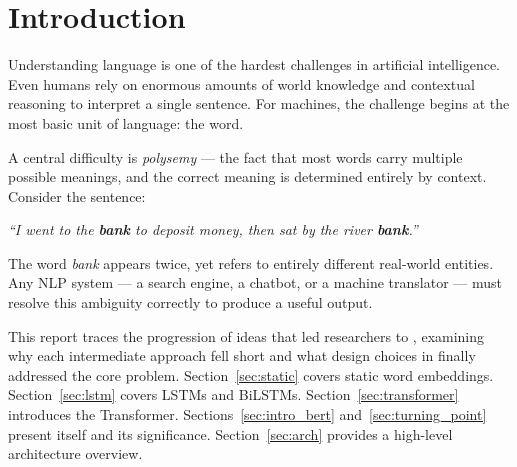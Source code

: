 \section{Introduction}
\label{sec:introduction}

Understanding language is one of the hardest challenges in artificial
intelligence. Even humans rely on enormous amounts of world knowledge and
contextual reasoning to interpret a single sentence. For machines, the
challenge begins at the most basic unit of language: the word.

A central difficulty is \emph{polysemy} --- the fact that most words carry
multiple possible meanings, and the correct meaning is determined entirely by
context. Consider the sentence:

\begin{center}
  \textit{``I went to the \textbf{bank} to deposit money, then sat by the
  river \textbf{bank}.''}
\end{center}

\noindent
The word \textit{bank} appears twice, yet refers to entirely different
real-world entities. Any NLP system --- a search engine, a chatbot, or a
machine translator --- must resolve this ambiguity correctly to produce a
useful output.

This report traces the progression of ideas that led researchers to \bert{},
examining why each intermediate approach fell short and what design choices in
\bert{} finally addressed the core problem.
Section~\ref{sec:static} covers static word embeddings.
Section~\ref{sec:lstm} covers LSTMs and BiLSTMs.
Section~\ref{sec:transformer} introduces the Transformer.
Sections~\ref{sec:intro_bert} and~\ref{sec:turning_point} present \bert{} itself
and its significance. Section~\ref{sec:arch} provides a high-level architecture
overview.

